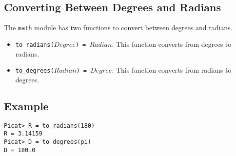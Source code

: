 \subsection{Converting Between Degrees and Radians}
The \texttt{math} module has two functions to convert between degrees and radians.
\begin{itemize}
\item \texttt{to\_radians($Degree$) = $Radian$}: This function converts from degrees to radians.
\item \texttt{to\_degrees($Radian$) = $Degree$}: This function converts from radians to degrees.
\end{itemize}

\subsection*{Example}
\begin{verbatim}
Picat> R = to_radians(180)
R = 3.14159
Picat> D = to_degrees(pi)
D = 180.0
\end{verbatim}

